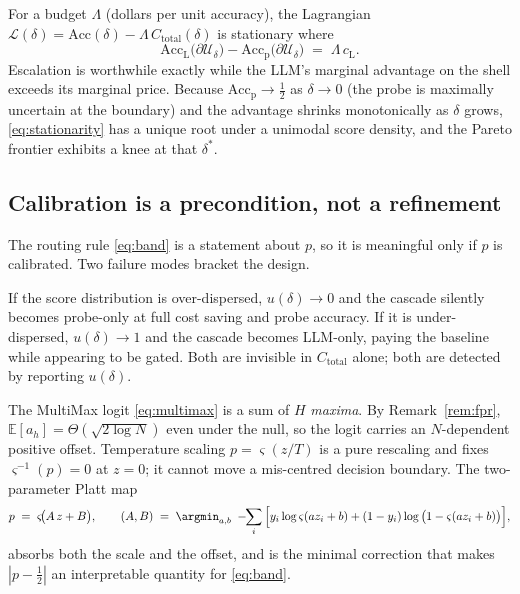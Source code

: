 \begin{proposition}
\label{prop:optimal-delta}
For a budget $\Lambda$ (dollars per unit accuracy), the Lagrangian
$\mathcal{L}(\delta)=\mathrm{Acc}(\delta)-\Lambda\,C_{\mathrm{total}}(\delta)$ is
stationary where
\begin{equation}
  \mathrm{Acc}_{\mathrm{L}}\!\big(\partial\mathcal{U}_\delta\big)
  -\mathrm{Acc}_{\mathrm{p}}\!\big(\partial\mathcal{U}_\delta\big)
  \;=\;\Lambda\,c_{\mathrm{L}} .
  \label{eq:stationarity}
\end{equation}
Escalation is worthwhile exactly while the LLM's marginal advantage on the shell exceeds
its marginal price. Because $\mathrm{Acc}_{\mathrm{p}}\to\frac12$ as $\delta\to0$ (the
probe is maximally uncertain at the boundary) and the advantage shrinks monotonically as
$\delta$ grows, \eqref{eq:stationarity} has a unique root under a unimodal score density,
and the Pareto frontier exhibits a knee at that $\delta^\ast$.
\end{proposition}

\subsection{Calibration is a precondition, not a refinement}
\label{sec:calibration}

The routing rule \eqref{eq:band} is a statement about $p$, so it is meaningful only if
$p$ is calibrated. Two failure modes bracket the design.

\begin{remark}
\label{rem:degenerate}
If the score distribution is over-dispersed, $u(\delta)\to0$ and the cascade silently
becomes probe-only at full cost saving and probe accuracy. If it is under-dispersed,
$u(\delta)\to1$ and the cascade becomes LLM-only, paying the baseline while appearing to
be gated. Both are invisible in $C_{\mathrm{total}}$ alone; both are detected by
reporting $u(\delta)$.
\end{remark}

\begin{remark}
\label{rem:platt}
The MultiMax logit \eqref{eq:multimax} is a sum of $H$ \emph{maxima}. By
Remark~\ref{rem:fpr}, $\mathbb{E}[a_h]=\Theta(\sqrt{2\log N})$ even under the null, so
the logit carries an $N$-dependent positive offset. Temperature scaling
$p=\varsigma(z/T)$ is a pure rescaling and fixes $\varsigma^{-1}(p)=0$ at $z=0$; it
cannot move a mis-centred decision boundary. The two-parameter Platt map
\begin{equation}
  p \;=\; \varsigma\!\big(A\,z+B\big),
  \qquad
  (A,B)\;=\;\argmin_{a,b}\;-\!\!\sum_i\Big[y_i\log\varsigma(az_i+b)+(1-y_i)\log\big(1-\varsigma(az_i+b)\big)\Big],
  \label{eq:platt}
\end{equation}
absorbs both the scale and the offset, and is the minimal correction that makes
$|p-\frac12|$ an interpretable quantity for \eqref{eq:band}.
\end{remark}


